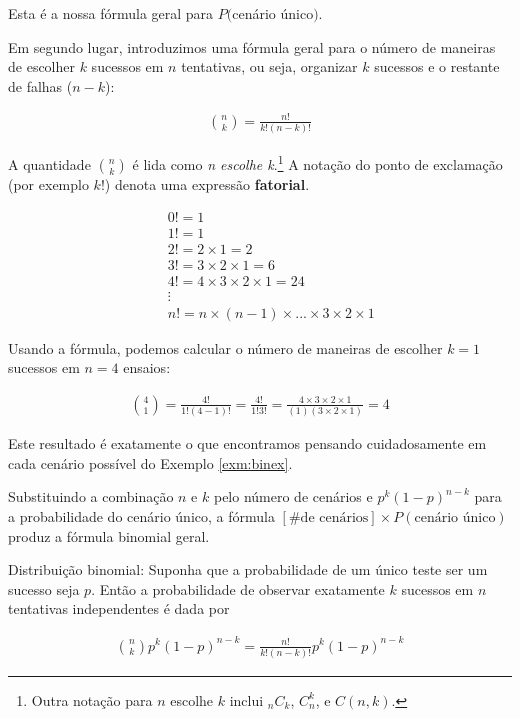 \documentclass[
]{book}
\theoremstyle{definition}
\theoremstyle{definition}
\theoremstyle{definition}
\theoremstyle{definition}
\theoremstyle{remark}
\begin{document}
Esta é a nossa fórmula geral para \(P(\)cenário único\()\).

Em segundo lugar, introduzimos uma fórmula geral para o número de maneiras de escolher \(k\) sucessos em \(n\) tentativas, ou seja, organizar \(k\) sucessos e o restante de falhas (\(n-k\)):

\begin{eqnarray*}
{n\choose k} = \frac{n!}{k!(n-k)!}
\end{eqnarray*}

A quantidade \({n\choose k}\) é lida como \emph{n escolhe k}.\footnote{Outra notação para \(n\) escolhe \(k\) inclui \(_nC_k\), \(C_n^k\), e \(C(n,k)\).} A notação do ponto de exclamação (por exemplo \(k!\)) denota uma expressão \textbf{fatorial}.

\begin{eqnarray*}
&& 0! = 1 \label{zeroFactorial} \\
&& 1! = 1 \\
&& 2! = 2\times1 = 2 \\
&& 3! = 3\times2\times1 = 6 \\
&& 4! = 4\times3\times2\times1 = 24 \\
&& \vdots \\
&& n! = n\times(n-1)\times...\times3\times2\times1
\end{eqnarray*}

Usando a fórmula, podemos calcular o número de maneiras de escolher \(k=1\) sucessos em \(n=4\) ensaios:

\begin{eqnarray*}
{4 \choose 1} = \frac{4!}{1!(4-1)!} =  \frac{4!}{1!3!} 
    = \frac{4\times3\times2\times1}{(1)(3\times2\times1)} = 4
\end{eqnarray*}

Este resultado é exatamente o que encontramos pensando cuidadosamente em cada cenário possível do Exemplo \ref{exm:binex}.

Substituindo a combinação \(n\) e \(k\) pelo número de cenários e \(p^k(1-p)^{n-k}\) para a probabilidade do cenário único, a fórmula \([\text{\# de cenários}] \times P(\text{cenário único})\) produz a fórmula binomial geral.

Distribuição binomial: Suponha que a probabilidade de um único teste ser um sucesso seja \(p\). Então a probabilidade de observar exatamente \(k\) sucessos em \(n\) tentativas independentes é dada por

\begin{eqnarray}
{n\choose k}p^k(1-p)^{n-k} = \frac{n!}{k!(n-k)!}p^k(1-p)^{n-k}
\label{eq:binomialFormula}
\end{eqnarray}
\end{document}
